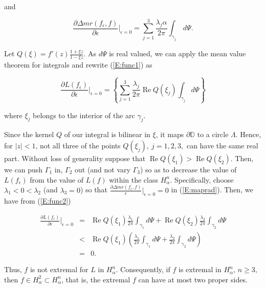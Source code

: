 \documentclass{cmft}
\newcommand{\D}{\mathbb{D}}
\newcommand{\del}{\partial}
\newcommand{\e}{\epsilon}
\newcommand{\al}{\alpha}
\newcommand{\abs}[1]{\lvert#1\rvert}
\DeclareMathOperator{\re}{Re}
\begin{document}
and

\begin{equation}\label{E:maprad}
\frac{\partial \Delta mr(f_{\e},f)}{\partial\e} \biggr\vert_{\e = 0} =
\sum_{j=1}^3 \frac{\lambda_j \alpha
}{2\pi}\int_{\gamma_j} \,d\Psi .
\end{equation}

\noindent Let $Q(\xi) = f'(z)\frac{1+\xi z}{1-\xi z}$. As $d\Psi$ is real valued,
we can apply the mean value theorem for integrals and rewrite (\ref{E:func1}) as

\begin{equation}\label{E:func2}
\frac{\del L(f_{\e})}{\del \e}\biggr\vert_{\e = 0} = \left \{\sum_{j=1}^3 \frac{\lambda_j
}{2\pi} \re Q(\xi_j) \int_{\gamma_j} d\Psi \right \}
\end{equation}

\noindent where $\xi_j$ belongs to the interior of the arc $\gamma_j$.

Since the kernel $Q$ of our integral is bilinear in $\xi$, it maps $\partial \D$
 to a
circle $\Lambda$.  Hence, for $\abs{z}<1$, 
not all three of the points $Q(\xi_j),\ j=1,2,3,$ can
have the same real part.  Without loss 
of generality suppose that $\re Q(\xi_1) > \re
Q(\xi_2)$.  Then, we can push $\Gamma_1$ in, $\Gamma_2$ out (and not vary
$\Gamma_3$) so as to decrease the value of $L(f_{\e})$ from the value of $L(f)$
within the class $H_{\al}^n$.  Specifically, choose $\lambda_1 < 0 < \lambda_2$
(and $\lambda_3 = 0$) so that $\frac{\partial \Delta mr(f_{\e},f)}{\e} 
\big \vert_{\e = 0}
= 0$ in (\ref{E:maprad}).  Then, we have from (\ref{E:func2})

\begin{eqnarray}\label{E:func3}
\frac{\del L(f_{\e})}{\del \e}\biggr\vert_{\e = 0} &=& \re Q(\xi_1) \frac{\lambda_1}{2\pi}
\int_{\gamma_1} d\Psi + \re Q(\xi_2) \frac{\lambda_2}{2\pi} \int_{\gamma_2} d\Psi
\\ \nonumber &<& \re Q(\xi_1) \left(\frac{\lambda_1}{2\pi} \int_{\gamma_1} d\Psi +
\frac{\lambda_2}{2\pi} \int_{\gamma_2} d\Psi \right) \\ \nonumber &=& 0 .\nonumber
\end{eqnarray}


Thus, $f$ is not extremal for $L$ in $H_{\al}^n$.  Consequently, if $f$ is
extremal in $H_{\al}^n,\, n\geq 3,$ then $f\in H_{\al}^2 \subset H_{\al}^n$,
that is,  the extremal $f$ can have at most two proper sides.  
\end{document}
